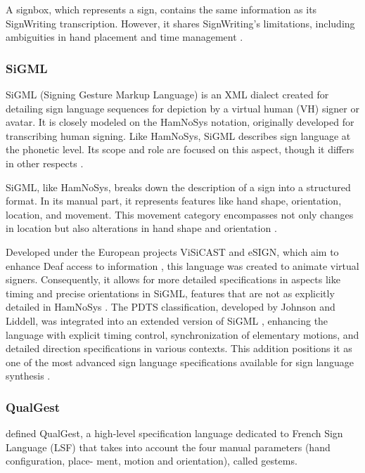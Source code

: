 A signbox, which represents a sign, contains the same information as its SignWriting transcription. However, it shares SignWriting's limitations, including ambiguities in hand placement and time management \parencite{naert2020survey}.


\subsubsection{SiGML}

SiGML (Signing Gesture Markup Language) is an XML dialect created for detailing sign language sequences for depiction by a virtual human (VH) signer or avatar. It is closely modeled on the HamNoSys notation, originally developed for transcribing human signing. Like HamNoSys, SiGML describes sign language at the phonetic level. Its scope and role are focused on this aspect, though it differs in other respects \parencite{glauert2011extending}.

SiGML, like HamNoSys, breaks down the description of a sign into a structured format. In its manual part, it represents features like hand shape, orientation, location, and movement. This movement category encompasses not only changes in location but also alterations in hand shape and orientation \parencite{glauert2011extending}.

Developed under the European projects ViSiCAST and eSIGN, which aim to enhance Deaf access to information \parencite{kennaway2003experience}, this language was created to animate virtual signers. Consequently, it allows for more detailed specifications in aspects like timing and precise orientations in SiGML, features that are not as explicitly detailed in HamNoSys \parencite{naert2020survey}. The PDTS classification, developed by Johnson and Liddell, was integrated into an extended version of SiGML \parencite{glauert2011extending}, enhancing the language with explicit timing control, synchronization of elementary motions, and detailed direction specifications in various contexts. This addition positions it as one of the most advanced sign language specifications available for sign language synthesis \parencite{naert2020survey}.

\subsubsection{QualGest}

\textcite{lebourque1999high} defined QualGest, a
high-level specification language dedicated to French Sign Language (LSF) that takes into
account the four manual parameters (hand configuration, place-
ment, motion and orientation), called gestems.

